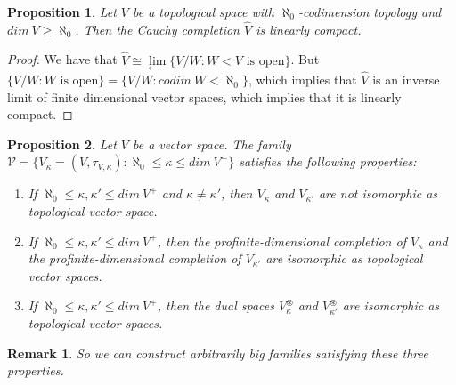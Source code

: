 \documentclass[a4paper,12pt]{article}
\newtheorem{prop}{Proposition}[section]
\newtheorem{obs}{Remark}[section]
\theoremstyle{bloco}
\begin{document}
\begin{prop}Let $V$ be a topological space with $\aleph_{0}$-codimension topology and $dim \ V \geqslant \aleph_{0}$. Then the Cauchy completion $\hat{V}$ is linearly compact. 
\end{prop}

\begin{proof}We have that $\hat{V} \cong \lim\limits_{\longleftarrow}\{V/W: W< V \text{ is open}\}$. But $\{V/W: W \text{ is open} \} = \{V/W: codim \ W < \aleph_{0}\}$, which implies that $\hat{V}$ is an inverse limit of finite dimensional vector spaces, which implies that it is linearly compact.
\end{proof}

\begin{prop}\label{bigfamily}Let $V$ be a vector space. The family $\mathcal{V} = \{V_{\kappa} =(V,\tau_{V,\kappa}): \aleph_{0} \leqslant \kappa \leqslant dim \ V^{+}\}$ satisfies the following properties:

\begin{enumerate}
    \item If $\aleph_{0} \leqslant \kappa, \kappa' \leqslant dim \ V^{+}$ and $\kappa \neq \kappa'$, then $V_{\kappa}$ and $V_{\kappa'}$ are not isomorphic as topological vector space.
    \item If $\aleph_{0} \leqslant \kappa, \kappa' \leqslant dim \ V^{+}$, then the profinite-dimensional completion of $V_{\kappa}$ and the profinite-dimensional completion of $V_{\kappa'}$ are isomorphic as topological vector spaces.
    \item If $\aleph_{0} \leqslant \kappa, \kappa' \leqslant dim \ V^{+}$, then the dual spaces $V_{\kappa}^{\circledast}$ and $V_{\kappa'}^{\circledast}$ are isomorphic as topological vector spaces.
\end{enumerate}
\end{prop}

\begin{obs}So we can construct arbitrarily big families satisfying these three properties.
\end{obs}
\end{document}
